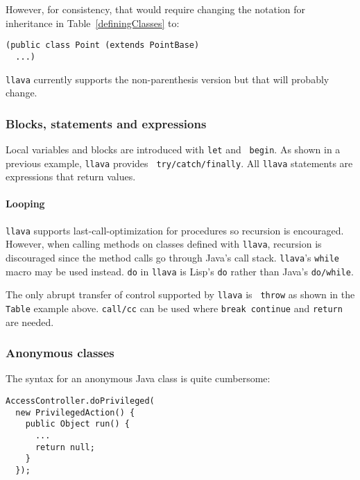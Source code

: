 \documentclass{acm-final/sig-alternate-modified}
\begin{document}
However, for consistency, that would require changing the notation for
inheritance in Table~\ref{definingClasses} to:

\small
\begin{verbatim}
(public class Point (extends PointBase)
  ...)
\end{verbatim}
\normalsize

{\tt llava} currently supports the non-parenthesis version but that
will probably change.

\subsubsection{Blocks, statements and expressions}

Local variables and blocks are introduced with {\tt let} and {\tt
begin}.  As shown in a previous example, {\tt llava} provides {\tt
try/catch/finally}.  All {\tt llava} statements are expressions that
return values.

\paragraph{Looping}

{\tt llava} supports last-call-optimization for procedures so
recursion is encouraged.  However, when calling methods on classes
defined with {\tt llava}, recursion is discouraged since the method
calls go through Java's call stack.  {\tt llava}'s {\tt while} macro
may be used instead.  {\tt do} in {\tt llava} is Lisp's {\tt do}
rather than Java's {\tt do/while}.

The only abrupt transfer of control supported by {\tt llava} is {\tt
throw} as shown in the {\tt Table} example above.  {\tt call/cc} can
be used where {\tt break continue} and {\tt return} are needed.

\subsubsection{Anonymous classes}

The syntax for an anonymous Java class is quite cumbersome:

\small
\begin{verbatim}
AccessController.doPrivileged(
  new PrivilegedAction() {
    public Object run() {
      ...
      return null;
    }
  });
\end{verbatim}
\normalsize
\end{document}

